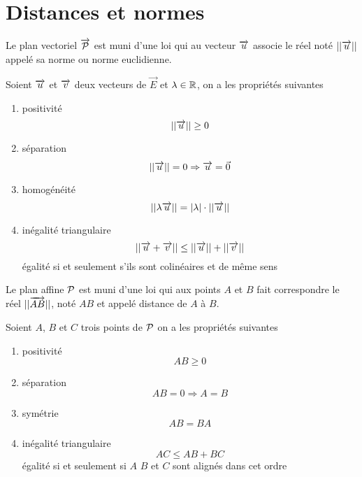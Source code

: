 \section{Distances et normes}

Le plan vectoriel $\vect{\P}$ est muni d'une loi qui au vecteur $\vu$ associe le réel noté $||\vu||$ appelé sa norme ou norme euclidienne.
\begin{prop}
  Soient $\vu$ et $\vv$ deux vecteurs de $\vec{E}$ et $\lambda \in \R$, on a les propriétés suivantes
  \begin{enumerate}
  \item positivité
    \begin{equation}
      ||\vu|| \geq 0
    \end{equation}
  \item séparation
    \begin{equation}
      ||\vu|| = 0 \Rightarrow \vu = \vec{0}
    \end{equation}
  \item homogénéité
    \begin{equation}
      ||\lambda \vu||=|\lambda| \cdot ||\vu||
    \end{equation}
  \item inégalité triangulaire
    \begin{equation}
      ||\vu+\vv|| \leq ||\vu|| + ||\vv||
    \end{equation}
    égalité si et seulement s'ils sont colinéaires et de même sens
  \end{enumerate}
\end{prop}
Le plan affine $\P$ est muni d'une loi qui aux points $A$ et $B$ fait correspondre le réel $||\vect{AB}||$, noté $AB$ et appelé distance de $A$ à $B$.
\begin{prop}
  Soient $A$, $B$ et $C$ trois points de $\P$ on a les propriétés suivantes
  \begin{enumerate}
  \item positivité
    \begin{equation}
      AB \geq 0
    \end{equation}
  \item séparation
    \begin{equation}
      AB = 0 \Rightarrow A=B
    \end{equation}
  \item symétrie
    \begin{equation}
      AB=BA
    \end{equation}
  \item inégalité triangulaire
    \begin{equation}
      AC \leq AB + BC
    \end{equation}
    égalité si et seulement si $A$ $B$ et $C$ sont alignés dans cet ordre
  \end{enumerate}
\end{prop}


